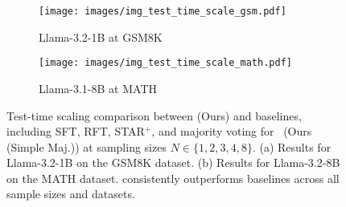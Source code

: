 \begin{figure*}[t]
\begin{minipage}{\textwidth}
    \centering
    \begin{subfigure}[t]{.495\textwidth}
    \texttt{[image: images/img\_test\_time\_scale\_gsm.pdf]} 
    \caption{Llama-3.2-1B at GSM8K}
    \end{subfigure}
    \begin{subfigure}[t]{.495\textwidth}
    \texttt{[image: images/img\_test\_time\_scale\_math.pdf]} 
    \caption{Llama-3.1-8B at MATH}
    \end{subfigure}
    \vspace{-.05in}
    \caption{Test-time scaling comparison between \sname (Ours) and baselines, including SFT, RFT, STAR$^+$, and majority voting for \sname~(Ours (Simple Maj.)) at sampling sizes $N\in\{1,2,3,4,8\}$. (a) Results for Llama-3.2-1B on the GSM8K dataset. (b) Results for Llama-3.2-8B on the MATH dataset. \sname consistently outperforms baselines across all sample sizes and datasets.}
    \label{figure:test_time_compute}
\end{minipage}
\vspace{-.1in}
\end{figure*}